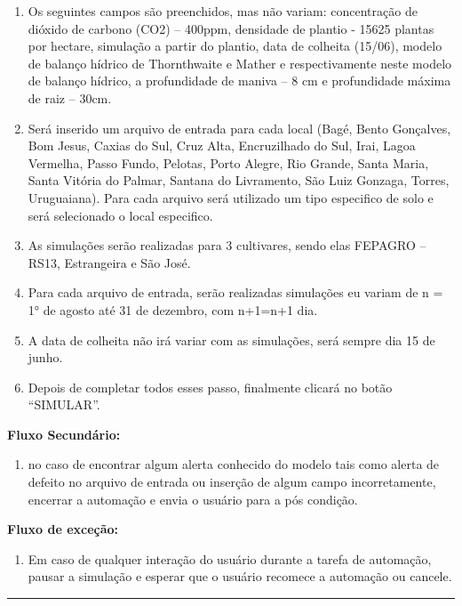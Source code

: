 \documentclass[12pt]{article}
\begin{document}
	\begin{enumerate}
		\item Os seguintes campos são preenchidos, mas não variam: concentração de dióxido de carbono (CO2) – 400ppm, densidade de plantio - 15625 plantas por hectare, simulação a partir do plantio, data de colheita (15/06), modelo de balanço hídrico de Thornthwaite e Mather e respectivamente neste modelo de balanço hídrico, a profundidade de maniva – 8 cm e profundidade máxima de raiz – 30cm.
		\item Será inserido um arquivo de entrada para cada local (Bagé, Bento Gonçalves, Bom Jesus, Caxias do Sul, Cruz Alta, Encruzilhado do Sul, Irai, Lagoa Vermelha, Passo Fundo, Pelotas, Porto Alegre, Rio Grande, Santa Maria, Santa Vitória do Palmar, Santana do Livramento, São Luiz Gonzaga, Torres, Uruguaiana). Para cada arquivo será utilizado um tipo especifico de solo e será selecionado o local especifico.
		\item As simulações serão realizadas para 3 cultivares, sendo elas FEPAGRO – RS13, Estrangeira e São José. 
		\item Para cada arquivo de entrada, serão realizadas simulações eu variam de n = 1° de agosto até 31 de dezembro, com n+1=n+1 dia.
		\item A data de colheita não irá variar com as simulações, será sempre dia 15 de junho.
		\item Depois de completar todos esses passo, finalmente clicará no botão “SIMULAR”. 
	\end{enumerate}
	
	{\bf Fluxo Secundário:}
	
	\begin{enumerate}
		\item no caso de encontrar algum alerta conhecido do modelo tais como alerta de defeito no arquivo de entrada ou inserção de algum campo incorretamente, encerrar a automação e envia o usuário para a pós condição.
	\end{enumerate}
		
	{\bf Fluxo de exceção:}
	
	\begin{enumerate}
		\item Em caso de qualquer interação do usuário durante a tarefa de automação, pausar a simulação e esperar que o usuário recomece a automação ou cancele.
	\end{enumerate}
	
	\bigskip \hrule \bigskip
	
	
\end{document}
